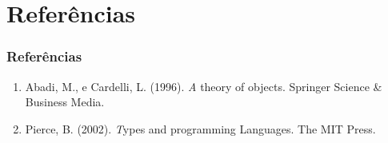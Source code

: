 \documentclass[10pt, compress]{beamer}
\begin{document}
\section{Referências}

\begin{frame}[fragile]
  \frametitle{Referências}
  \begin{enumerate}
  \item Abadi, M., e Cardelli, L. (1996). {\textit A theory of objects}. Springer Science \& Business Media.
  \item Pierce, B. (2002). {\textit Types and programming Languages}. The MIT Press.
  \end{enumerate}
\end{frame}

\end{document}
